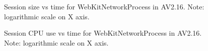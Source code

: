\documentclass{article}
\begin{document}
\begin{figure}[H]
        \caption{\label{FIGURE-AV216WebKitNetSizeVsTime} Session size vs time for WebKitNetworkProcess in AV2.16. Note: logarithmic scale on X axis.}
\end{figure}

\begin{figure}[H]
        \caption{\label{FIGURE-AV216WebKitNetCPUVsTime} Session CPU use vs time for WebKitNetworkProcess in AV2.16. Note: logarithmic scale on X axis.}
\end{figure}
\end{document}
